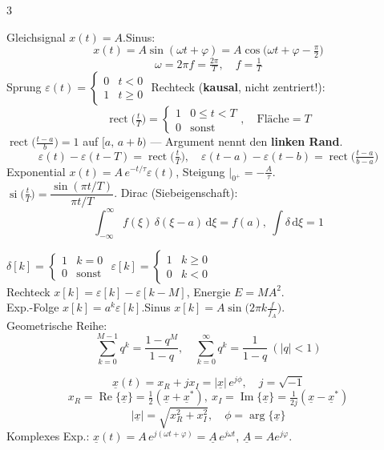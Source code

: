 \footnotesize
\begin{multicols}{3}

Gleichsignal $x(t)=A$.\quad Sinus:
\[ x(t)=A\sin(\omega t+\varphi)=A\cos\!\big(\omega t+\varphi-\tfrac{\pi}{2}\big) \]
\[ \omega=2\pi f=\tfrac{2\pi}{T},\quad f=\tfrac{1}{T} \]
Sprung $\varepsilon(t)=\begin{cases}0&t<0\\1&t\ge0\end{cases}$\;
Rechteck (\textbf{kausal}, nicht zentriert!):
\[ \operatorname{rect}\!\big(\tfrac{t}{T}\big)=\begin{cases}1&0\le t<T\\0&\text{sonst}\end{cases},\quad \text{Fläche}=T \]
$\operatorname{rect}\!\big(\tfrac{t-a}{b}\big)=1$ auf $[a,\,a+b)$ — Argument nennt den \textbf{linken Rand}.
\[ \varepsilon(t)-\varepsilon(t-T)=\operatorname{rect}\!\big(\tfrac{t}{T}\big),\quad
   \varepsilon(t-a)-\varepsilon(t-b)=\operatorname{rect}\!\big(\tfrac{t-a}{b-a}\big) \]
Exponential $x(t)=A\,e^{-t/\tau}\varepsilon(t)$, Steigung $|_{0^+}=-\tfrac{A}{\tau}$.\\
$\operatorname{si}\!\big(\tfrac{t}{T}\big)=\dfrac{\sin(\pi t/T)}{\pi t/T}$.\quad
Dirac (Siebeigenschaft):
\[ \int_{-\infty}^{\infty}\! f(\xi)\,\delta(\xi-a)\,\mathrm d\xi=f(a),\ \int\delta\,\mathrm d\xi=1 \]

$\delta[k]=\begin{cases}1&k=0\\0&\text{sonst}\end{cases}$\quad
$\varepsilon[k]=\begin{cases}1&k\ge0\\0&k<0\end{cases}$\\
Rechteck $x[k]=\varepsilon[k]-\varepsilon[k-M]$, Energie $E=MA^2$.\\
Exp.-Folge $x[k]=a^k\varepsilon[k]$.\quad Sinus $x[k]=A\sin\!\big(2\pi k\tfrac{f}{f_A}\big)$.\\
Geometrische Reihe:
\[ \sum_{k=0}^{M-1}\! q^k=\frac{1-q^M}{1-q},\quad \sum_{k=0}^{\infty} q^k=\frac{1}{1-q}\ (|q|<1) \]

\[ \underline{x}(t)=x_R+jx_I=|\underline{x}|\,e^{j\phi},\quad j=\sqrt{-1} \]
\[ x_R=\operatorname{Re}\{\underline x\}=\tfrac12(\underline x+\underline x^{*}),\
   x_I=\operatorname{Im}\{\underline x\}=\tfrac{1}{2j}(\underline x-\underline x^{*}) \]
\[ |\underline x|=\sqrt{x_R^2+x_I^2},\quad \phi=\arg\{\underline x\} \]
Komplexes Exp.: $\underline x(t)=A\,e^{j(\omega t+\varphi)}=\underline A\,e^{j\omega t}$, $\underline A=A e^{j\varphi}$.


\end{multicols}

